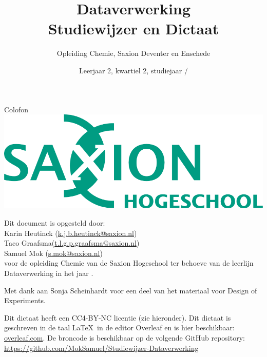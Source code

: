 \documentclass[a4paper,12pt,oneside]{book}
\title{Dataverwerking \\ Studiewijzer en Dictaat }
\author{Opleiding Chemie, Saxion Deventer en Enschede}
\date{Leerjaar 2, kwartiel 2, studiejaar \the\year/\NextYear{}}
\begin{document}
\lstset{language=r}
\lstset{style=mystyle}

\maketitle
\begin{center}
{\Large Colofon}\\
\vspace{15mm}
\includegraphics[width=0.7\linewidth]{lg_saxion_rgb.png}
\end{center}
\vspace{10mm}
Dit document is opgesteld door:\\
Karin Heutinck (\href{k.j.b.heutinck@saxion.nl}{\textsf{k.j.b.heutinck@saxion.nl}})\\
Taco Graafsma(\href{t.l.g.p.graafsma@saxion.nl}{\textsf{t.l.g.p.graafsma@saxion.nl}})\\
Samuel Mok (\href{s.mok@saxion.nl}{\textsf{s.mok@saxion.nl}})\\
voor de opleiding Chemie van de Saxion Hogeschool ter behoeve van de leerlijn Dataverwerking in het jaar \the\year.

Met dank aan Sonja Scheinhardt voor een deel van het materiaal voor Design of Experiments.

Dit dictaat heeft een CC4-BY-NC licentie (zie hieronder). Dit dictaat is geschreven in de taal \LaTeX\ in de editor Overleaf en is hier beschikbaar: \href{https://www.overleaf.com/read/sgpyzkvsfkpc
}{overleaf.com}. De broncode is beschikbaar op de volgende GitHub repository: \href{https://github.com/MokSamuel/Studiewijzer-Dataverwerking}{https://github.com/MokSamuel/Studiewijzer-Dataverwerking}


\doclicenseThis


\tableofcontents







\begin{appendices}

\end{appendices}
\end{document}
